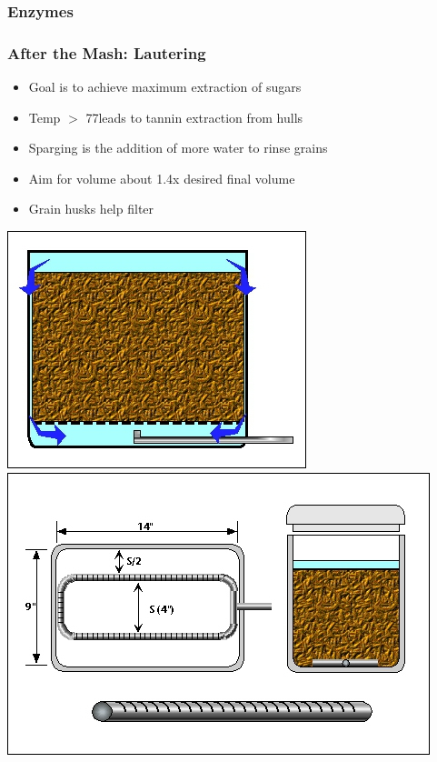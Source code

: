 \documentclass{beamer}
\begin{document}
\begin{frame}
\frametitle{Enzymes}

  \begin{table}[]

\centering
\caption{Mash Enzymes and Their Optimal Temperatures}
\label{enz}
\end{table}
\end{frame}



\begin{frame}
\frametitle{After the Mash: Lautering}
\begin{itemize}
\item Goal is to achieve maximum extraction of sugars
\item Temp $>$ 77\degree  leads to tannin extraction from hulls
  \item Sparging is the addition of more water to rinse grains
\item Aim for volume about 1.4x desired final volume
\item Grain husks help filter
\end{itemize}
\includegraphics[width=.41\textwidth]{./brewing/lauter1.jpg}
\hspace*{3mm}
\includegraphics[width=.488\textwidth]{./brewing/lauter2.jpg}
\end{frame}
\end{document}
